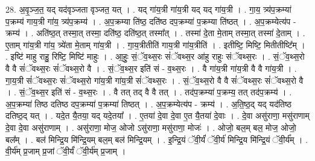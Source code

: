 \documentclass[17pt]{extarticle}
\begin{document}
28. अ॒वृ॒ञ्ज॒त॒ यद् यद॑वृञ्जता वृञ्जत॒ यत् । . यद् गा॑य॒त्री गा॑य॒त्री यद् यद् गा॑य॒त्री । . गा॒य॒ त्र्य॑प॒क्रम्या॑ प॒क्रम्य॑ गाय॒त्री गा॑य॒ त्र्य॑प॒क्रम्य॑ । . अ॒प॒क्रम्या ति॑ष्ठ॒ दति॑ष्ठ दप॒क्रम्या॑ प॒क्रम्या ति॑ष्ठत् । . अ॒प॒क्रम्येत्य॑प - क्रम्य॑ । . अति॑ष्ठ॒त् तस्मा॒त् तस्मा॒ दति॑ष्ठ॒ दति॑ष्ठ॒त् तस्मा᳚त् । . तस्मा॑ दे॒ता मे॒ताम् तस्मा॒त् तस्मा॑ दे॒ताम् । . ए॒ताम् गा॑य॒त्री गा॑य॒ त्र्ये॑ता मे॒ताम् गा॑य॒त्री । . गा॒य॒त्रीतीति॑ गाय॒त्री गा॑य॒त्रीति॑ । . इतीष्टि॒ मिष्टि॒ मितीतीष्टि᳚म् । . इष्टि॑ माहु राहु॒ रिष्टि॒ मिष्टि॑ माहुः । . आ॒हुः॒ सं॒ॅव॒थ्स॒रः सं॑ॅवथ्स॒र आ॑हु राहुः संॅवथ्स॒रः । . सं॒ॅव॒थ्स॒रो वै वै सं॑ॅवथ्स॒रः सं॑ॅवथ्स॒रो वै । . सं॒ॅव॒थ्स॒र इति॑ सं - व॒थ्स॒रः । . वै गा॑य॒त्री गा॑य॒त्री वै वै गा॑य॒त्री । . गा॒य॒त्री सं॑ॅवथ्स॒रः सं॑ॅवथ्स॒रो गा॑य॒त्री गा॑य॒त्री सं॑ॅवथ्स॒रः । . सं॒ॅव॒थ्स॒रो वै वै सं॑ॅवथ्स॒रः सं॑ॅवथ्स॒रो वै । . सं॒ॅव॒थ्स॒र इति॑ सं - व॒थ्स॒रः । . वै तत् तद् वै वै तत् । . तद॑प॒क्रम्या॑ प॒क्रम्य॒ तत् तद॑प॒क्रम्य॑ । . अ॒प॒क्रम्या॑ तिष्ठ दतिष्ठ दप॒क्रम्या॑ प॒क्रम्या॑ तिष्ठत् । . अ॒प॒क्रम्येत्य॑प - क्रम्य॑ । . अ॒ति॒ष्ठ॒द् यद् यद॑तिष्ठ दतिष्ठ॒द् यत् । . यदे॒त यै॒तया॒ यद् यदे॒तया᳚ । . ए॒तया॑ दे॒वा दे॒वा ए॒त यै॒तया॑ दे॒वाः । . दे॒वा असु॑राणा॒ मसु॑राणाम् दे॒वा दे॒वा असु॑राणाम् । . असु॑राणा॒ मोज॒ ओजो ऽसु॑राणा॒ मसु॑राणा॒ मोजः॑ । . ओजो॒ बल॒म् बल॒ मोज॒ ओजो॒ बल᳚म् । . बल॑ मिन्द्रि॒य मि॑न्द्रि॒यम् बल॒म् बल॑ मिन्द्रि॒यम् । . इ॒न्द्रि॒यं ॅवी॒र्यं॑ ॅवी॒र्य॑ मिन्द्रि॒य मि॑न्द्रि॒यं ॅवी॒र्य᳚म् । . वी॒र्य॑म् प्र॒जाम् प्र॒जां ॅवी॒र्यं॑ ॅवी॒र्य॑म् प्र॒जाम् । \newline
\end{document}
